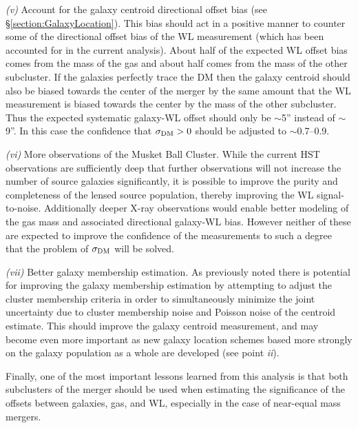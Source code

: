 \textit{(v)} Account for the galaxy centroid directional offset bias (see \S\ref{section:GalaxyLocation}).
This bias should act in a positive manner to counter some of the directional offset bias of the WL measurement (which has been accounted for in the current analysis).
About half of the expected WL offset bias comes from the mass of the gas and about half comes from the mass of the other subcluster.
If the galaxies perfectly trace the DM then the galaxy centroid should also be biased towards the center of the merger by the same amount that the WL measurement is biased towards the center by the mass of the other subcluster.
Thus the expected systematic galaxy-WL offset should only be $\sim$5'' instead of $\sim$9''.
In this case the confidence that $\sigma_{\rm DM}>0$ should be adjusted to $\sim$0.7--0.9. 

\textit{(vi)} More observations of the Musket Ball Cluster.
While the current HST observations are sufficiently deep that further observations will not increase the number of source galaxies significantly, it is possible to improve the purity and completeness of the lensed source population, thereby improving the WL signal-to-noise.
Additionally deeper X-ray observations would enable better modeling of the gas mass and associated directional galaxy-WL bias. 
However neither of these are expected to improve the confidence of the measurements to such a degree that the problem of $\sigma_{\rm DM}$ will be solved.

\textit{(vii)} Better galaxy membership estimation.
As previously noted there is potential for improving the galaxy membership estimation by attempting to adjust the cluster membership criteria in order to simultaneously minimize the joint uncertainty due to cluster membership noise and Poisson noise of the centroid estimate.
This should improve the galaxy centroid measurement, and may become even more important as new galaxy location schemes based more strongly on the galaxy population as a whole are developed (see point \textit{ii}).
 
 
Finally, one of the most important lessons learned from this analysis is that both subclusters of the merger should be used when estimating the significance of the offsets between galaxies, gas, and WL, especially in the case of near-equal mass mergers.


%



%
%  
